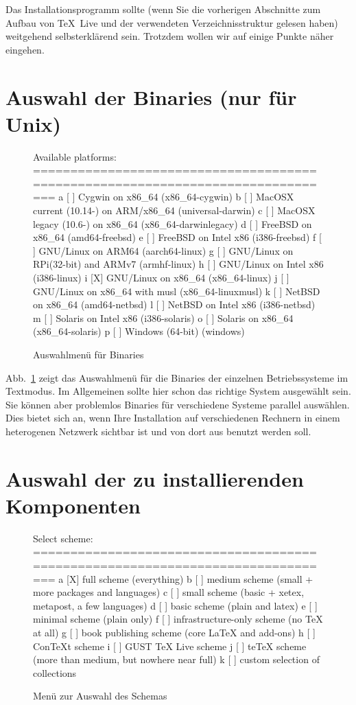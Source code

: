 \documentclass[12pt,ngerman,a4paper,fullparskip]{scrreprt}
\newcommand{\TL}{\TeX\ Live\xspace}
\begin{document}
Das Installationsprogramm sollte (wenn Sie die vorherigen Abschnitte zum Aufbau von \TL und der verwendeten Verzeichnisstruktur gelesen haben) weitgehend selbsterklärend sein. Trotzdem wollen wir auf einige Punkte näher eingehen.

\section{Auswahl der Binaries (nur für Unix)}\label{sec:binary}


\begin{figure}[tb]
\begin{boxedverbatim}
Available platforms:
===============================================================================
   a [ ] Cygwin on x86_64 (x86_64-cygwin)
   b [ ] MacOSX current (10.14-) on ARM/x86_64 (universal-darwin)
   c [ ] MacOSX legacy (10.6-) on x86_64 (x86_64-darwinlegacy)
   d [ ] FreeBSD on x86_64 (amd64-freebsd)
   e [ ] FreeBSD on Intel x86 (i386-freebsd)
   f [ ] GNU/Linux on ARM64 (aarch64-linux)
   g [ ] GNU/Linux on RPi(32-bit) and ARMv7 (armhf-linux)
   h [ ] GNU/Linux on Intel x86 (i386-linux)
   i [X] GNU/Linux on x86_64 (x86_64-linux)
   j [ ] GNU/Linux on x86_64 with musl (x86_64-linuxmusl)
   k [ ] NetBSD on x86_64 (amd64-netbsd)
   l [ ] NetBSD on Intel x86 (i386-netbsd)
   m [ ] Solaris on Intel x86 (i386-solaris)
   o [ ] Solaris on x86_64 (x86_64-solaris)
   p [ ] Windows (64-bit) (windows)
\end{boxedverbatim}
\caption{Auswahlmenü für Binaries}\label{fig:bin-text}
\end{figure}

\noindent Abb.~\ref{fig:bin-text} zeigt das Auswahlmenü für die Binaries der einzelnen Betriebssysteme im Textmodus. Im Allgemeinen sollte hier schon das richtige System ausgewählt sein. Sie können aber problemlos Binaries
für verschiedene Systeme parallel auswählen. Dies bietet sich an, wenn Ihre Installation auf verschiedenen Rechnern in einem heterogenen Netzwerk sichtbar ist und von dort aus benutzt werden soll.

\section{Auswahl der zu installierenden Komponenten}\label{sec:components}

\begin{figure}[tbh]
\begin{boxedverbatim}
Select scheme:
===============================================================================
 a [X] full scheme (everything)
 b [ ] medium scheme (small + more packages and languages)
 c [ ] small scheme (basic + xetex, metapost, a few languages)
 d [ ] basic scheme (plain and latex)
 e [ ] minimal scheme (plain only)
 f [ ] infrastructure-only scheme (no TeX at all)
 g [ ] book publishing scheme (core LaTeX and add-ons)
 h [ ] ConTeXt scheme
 i [ ] GUST TeX Live scheme
 j [ ] teTeX scheme (more than medium, but nowhere near full)
 k [ ] custom selection of collections
\end{boxedverbatim}
\caption{Menü zur Auswahl des Schemas}\label{fig:scheme-text}
\end{figure}
\end{document}
